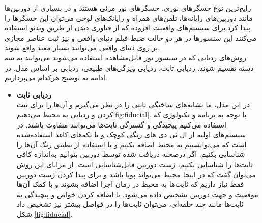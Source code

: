 رایج‌ترین نوع حسگرهای نوری، حسگرهای نور مرئی هستند و در بسیاری از دوربین‌ها مانند دوربین‌های رایانه‌ها، تلفن‌های همراه و رایانک‌های لوحی می‌توان این حسگرها را پیدا کرد.برای سیستم‌های واقعیت افزوده که از فناوری دیدن از طریق ویدئو استفاده می‌کنند این سنسورها در هر دو حالت ضبط فیلم دنیای واقعی و نیز ثبت عناصر مجازی بر روی دنیای واقعی می‌توانند بسیار مفید واقع شوند.
\\
روش‌های ردیابی که در سنسور نور قابل‌مشاهده استفاده می‌شوند می‌توانند به سه دسته تقسیم شوند. ردیابی ثابت، ردیابی ویژگی‌های طبیعی، ردیابی بر اساس مدل. در ادامه به توضیح هرکدام می‌پردازیم.
\begin{itemize}
	\item \textbf{ردیابی ثابت}
	\\
در این مدل، ما نشانه‌های ساختگی ثابتی را در نظر می‌گیرم و آن‌ها را  برای ثبت کردن و ردیابی به محیط می‌دهیم\ref{fig:fiducial}. با توجه به برنامه و تکنولوژی که استفاده می‌کنیم پیچیدگی و گسترگی ثابت‌ها می‌توانند متفاوت باشند. در سیستم‌های اولیه از ال ئی دی های رنگی کوچک و یا تکه‌های کاغذ استفاده‌شده است که می‌توانستیم به محیط اضافه بکنیم و با استفاده از تطبیق رنگ آن‌ها را شناسایی بکنیم. اگر درصحنه دریافت شده توسط دوربین بتوانیم به‌اندازه کافی ثابت‌ها را شناسایی بکنیم، ژست دوربین قابل‌شناسایی است. از مزایای این روش می‌توان گفت که در اینجا محیط می‌تواند پویا باشد و برای پیدا کردن ژست دوربین فقط نیاز داریم که ثابت‌ها به محیط در زمان اجزا اضافه بشوند و با کمک آن‌ها موقعیت و جهت دوربین تشخیص داده می‌شود. با اضافه کردن خواص و پیچیدگی به ثابت‌ها مانند چند حلقه‌ای، می‌توان ثابت‌ها را در فواصل بیشتر نیز تشخیص داد شکل \ref{fig:fiducial}\cite{cho1998multi}.
	

\end{itemize}
